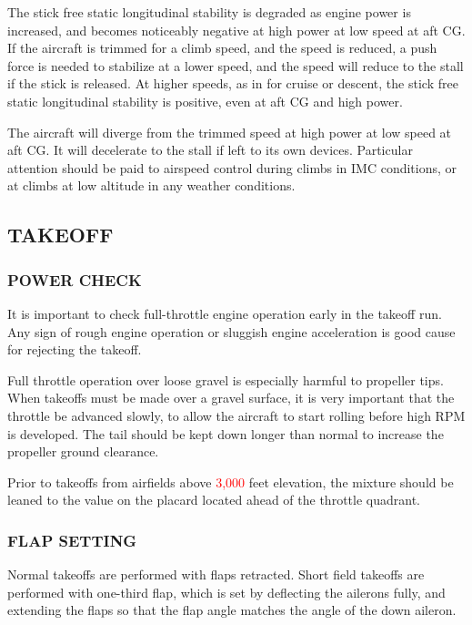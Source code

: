 The stick free static longitudinal stability is degraded as engine power is increased, and becomes noticeably negative at high power at low speed at aft CG. If the aircraft is trimmed for a climb speed, and the speed is reduced, a push force is needed to stabilize at a lower speed, and the speed will reduce to the stall if the stick is released. At higher speeds, as in for cruise or descent, the stick free static longitudinal stability is positive, even at aft CG and high power.
 
\begin{Note}[WARNING]
The aircraft will diverge from the trimmed speed at high power at low speed at aft CG. It will decelerate to the stall if left to its own devices. Particular attention should be paid to airspeed control during climbs in IMC conditions, or at climbs at low altitude in any weather conditions.
\end{Note}

\subsection{TAKEOFF}
  \subsubsection{POWER CHECK}
    It is important to check full-throttle engine operation early in the takeoff run. Any sign of rough engine operation or sluggish engine acceleration is good cause for rejecting the takeoff.
    
    Full throttle operation over loose gravel is especially harmful to propeller tips. When takeoffs must be made over a gravel surface, it is very important that the throttle be advanced slowly, to allow the aircraft to start rolling before high RPM is developed. The tail should be kept down longer than normal to increase the propeller ground clearance.
    
    Prior to takeoffs from airfields above \textcolor{red}{3,000} feet elevation, the mixture should be leaned to the value on the placard located ahead of the throttle quadrant.
    
  \subsubsection{FLAP SETTING}
    Normal takeoffs are performed with flaps retracted. Short field takeoffs are performed with one-third flap, which is set by deflecting the ailerons fully, and extending the flaps so that the flap angle matches the angle of the down aileron.
    
